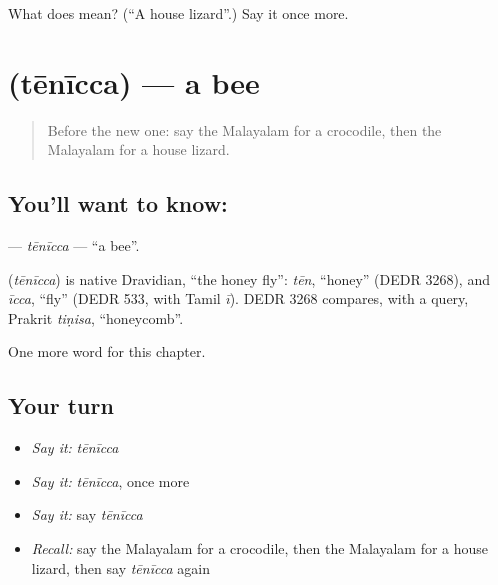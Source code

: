 \begin{tcolorbox}[breakable,colback=teal!4,colframe=teal!35!black,title={Before you move on}]
What does  mean? (\textquotedblleft{}A house lizard\textquotedblright{}.) Say it once more.
\end{tcolorbox}
\section[\texorpdfstring{\ml{തേനീച്ച} (tēnīcca)}{തേനീച്ച (tēnīcca)}]{ (tēnīcca) — a bee}

\label{lesson:ML-C327-tenicca}



\begin{quote}
Before the new one: say the Malayalam for a crocodile, then the Malayalam for a house lizard.
\end{quote}

\subsection*{You'll want to know: }
\textbf{} — \emph{tēnīcca} — \textquotedblleft{}a bee\textquotedblright{}.

\begin{cousinweb}
\textbf{} (\emph{tēnīcca}) is native Dravidian, \textquotedblleft{}the honey fly\textquotedblright{}: \emph{tēn}, \textquotedblleft{}honey\textquotedblright{} (DEDR 3268), and \emph{īcca}, \textquotedblleft{}fly\textquotedblright{} (DEDR 533, with Tamil \emph{ī}). DEDR 3268 compares, with a query, Prakrit \emph{tiṇisa}, \textquotedblleft{}honeycomb\textquotedblright{}.
\end{cousinweb}

\begin{grammarlens}[title={What you've built}]
One more word for this chapter.
\end{grammarlens}

\subsection*{Your turn}
\begin{itemize}
\raggedright
  \item \emph{Say it:} \emph{tēnīcca}
  \item \emph{Say it:} \emph{tēnīcca}, once more
  \item \emph{Say it:} say \emph{tēnīcca}
  \item \emph{Recall:} say the Malayalam for a crocodile, then the Malayalam for a house lizard, then say \emph{tēnīcca} again
\end{itemize}

